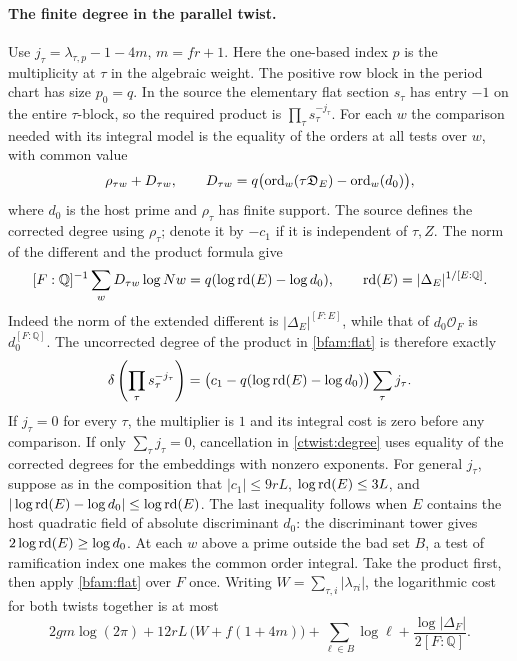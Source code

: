 \paragraph{The finite degree in the parallel twist.}
Use \(j_\tau=\lambda_{\tau,p}-1-4m\), \(m=fr+1\). Here the
one-based index \(p\) is the multiplicity at \(\tau\) in the
algebraic weight. The positive row block in the period chart has
size \(p_0=q\). In the
source the elementary flat section \(s_\tau\) has entry \(-1\)
on the entire \(\tau\)-block, so the required product is
\(\prod_\tau s_\tau^{-j_\tau}\). For each \(w\) the comparison
needed with its integral model is the equality of the orders at
all tests over \(w\), with common value
\[
 \rho_{\tau w}+D_{\tau w},\qquad
 D_{\tau w}=q\bigl({\rm ord}_w(\tau\mathfrak D_E)
                            -{\rm ord}_w(d_0)\bigr),
\]
where \(d_0\) is the host prime and \(\rho_\tau\) has finite
support. The source defines the corrected degree using
\(\rho_\tau\); denote it by \(-c_1\) if it is independent of
\(\tau,Z\). The norm of the different and the product formula
give
\[
 [F:\mathbb Q]^{-1}\sum_w D_{\tau w}\log Nw
      =q(\log {\rm rd}(E)-\log d_0),\qquad
 {\rm rd}(E)=|\Delta_E|^{1/[E:\mathbb Q]} .
\]
Indeed the norm of the extended different is
\(|\Delta_E|^{[F:E]}\), while that of \(d_0\mathcal O_F\) is
\(d_0^{[F:\mathbb Q]}\). The uncorrected degree of the product
in \eqref{bfam:flat} is therefore exactly
\begin{equation}\label{ctwist:degree}
 \delta\left(\prod_\tau s_\tau^{-j_\tau}\right)
   =\bigl(c_1-q(\log{\rm rd}(E)-\log d_0)\bigr)
       \sum_\tau j_\tau .
\end{equation}
If \(j_\tau=0\) for every \(\tau\), the multiplier is \(1\) and its
integral cost is zero before any comparison. If only
\(\sum_\tau j_\tau=0\), cancellation in \eqref{ctwist:degree}
uses equality of the corrected degrees for the embeddings with
nonzero exponents. For general \(j_\tau\), suppose as in the composition
that \(|c_1|\le9rL\), \(\log{\rm rd}(E)\le3L\), and
\(|\log{\rm rd}(E)-\log d_0|\le\log{\rm rd}(E)\).
The last inequality follows when \(E\) contains the host quadratic
field of absolute discriminant \(d_0\): the discriminant tower
gives \(2\log{\rm rd}(E)\ge\log d_0\).
At each \(w\) above a prime outside the bad set \(B\), a test of
ramification index one makes the common order integral. Take the
product first, then apply \eqref{bfam:flat} over \(F\) once.
Writing \(W=\sum_{\tau,i}|\lambda_{\tau i}|\), the logarithmic
cost for both twists together is at most
\[
 2gm\log(2\pi)+12rL\,\bigl(W+f(1+4m)\bigr)
 +\sum_{\ell\in B}\log\ell
 +\frac{\log|\Delta_F|}{2[F:\mathbb Q]} .
\]
